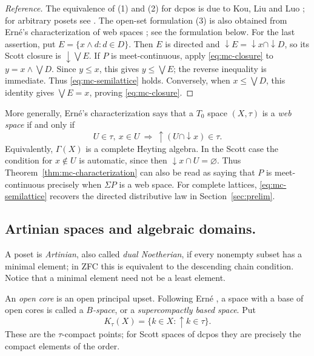 \documentclass[11pt,reqno]{amsart}
\theoremstyle{definition}
\numberwithin{equation}{section}
\begin{document}
\begin{proof}[Reference]
The equivalence of (1) and (2) for dcpos is due to Kou, Liu and Luo
\citep{KouLiuLuo2003}; for arbitrary posets see
\citet[Theorem~3.8]{MaoXu2009}. The open-set formulation (3) is also
obtained from Ern\'e's characterization of web spaces
\citep[Theorem~3]{Erne2009}; see the formulation below.
For the last assertion, put $E=\{x\wedge d:d\in D\}$. Then $E$ is
directed and ${\downarrow} E={\downarrow} x\cap{\downarrow} D$, so its Scott
closure is ${\downarrow}\bigvee E$. If $P$ is meet-continuous, apply
\eqref{eq:mc-closure} to $y=x\wedge\bigvee D$. Since $y\leq x$, this
gives $y\leq\bigvee E$; the reverse inequality is immediate. Thus
\eqref{eq:mc-semilattice} holds. Conversely, when $x\leq\bigvee D$,
this identity gives $\bigvee E=x$, proving \eqref{eq:mc-closure}.
\end{proof}

More generally, Ern\'e's characterization
\citep[Theorem~3]{Erne2009} says that a $T_0$ space $(X,\tau)$ is a
\emph{web space} if and only if
\begin{equation}\label{eq:web-open}
  U\in\tau,~ x\in U
  ~\Longrightarrow~
  {\uparrow}(U\cap{\downarrow} x)\in\tau.
\end{equation}
Equivalently, $\Gamma(X)$ is a complete Heyting algebra. In the Scott
case the condition for $x\notin U$ is automatic, since then
${\downarrow} x\cap U=\varnothing$. Thus
Theorem~\ref{thm:mc-characterization} can also be read as saying that
$P$ is meet-continuous precisely when $\Sigma P$ is a web space.
For complete lattices, \eqref{eq:mc-semilattice} recovers the directed
distributive law in Section~\ref{sec:prelim}.

\subsection{Artinian spaces and algebraic domains.}
A poset is \emph{Artinian}, also called \emph{dual Noetherian}, if every
nonempty subset has a minimal element; in ZFC this is equivalent to
the descending chain condition. Notice that a minimal element need
not be a least element.

An \emph{open core} is an open principal upset. Following Ern\'e
\citep[Section~5]{Erne2009}, a space with a base of open cores is called
a \emph{$B$-space}, or a \emph{supercompactly based space}. Put
\[
  K_\tau(X)=\{k\in X:{\uparrow} k\in\tau\}.
\]
These are the $\tau$-compact points; for Scott spaces of dcpos they
are precisely the compact elements of the order.
\end{document}
